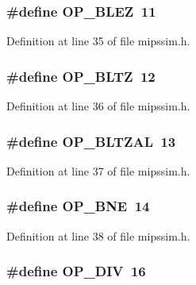 \subsubsection[{O\+P\+\_\+\+B\+L\+EZ}]{\setlength{\rightskip}{0pt plus 5cm}\#define O\+P\+\_\+\+B\+L\+EZ~11}\label{mipssim_8h_aedf0466946ee311d8815fac4a0454a73}


Definition at line 35 of file mipssim.\+h.

\subsubsection[{O\+P\+\_\+\+B\+L\+TZ}]{\setlength{\rightskip}{0pt plus 5cm}\#define O\+P\+\_\+\+B\+L\+TZ~12}\label{mipssim_8h_a5a37e5515123565e6e9eab363be791c2}


Definition at line 36 of file mipssim.\+h.

\subsubsection[{O\+P\+\_\+\+B\+L\+T\+Z\+AL}]{\setlength{\rightskip}{0pt plus 5cm}\#define O\+P\+\_\+\+B\+L\+T\+Z\+AL~13}\label{mipssim_8h_aa7130089afe11aedee350da9f595e5d5}


Definition at line 37 of file mipssim.\+h.

\subsubsection[{O\+P\+\_\+\+B\+NE}]{\setlength{\rightskip}{0pt plus 5cm}\#define O\+P\+\_\+\+B\+NE~14}\label{mipssim_8h_adb4ff5c07c502d513c76461f1ea48f69}


Definition at line 38 of file mipssim.\+h.

\subsubsection[{O\+P\+\_\+\+D\+IV}]{\setlength{\rightskip}{0pt plus 5cm}\#define O\+P\+\_\+\+D\+IV~16}\label{mipssim_8h_addec4be73478fb9243f0ea0087366641}



